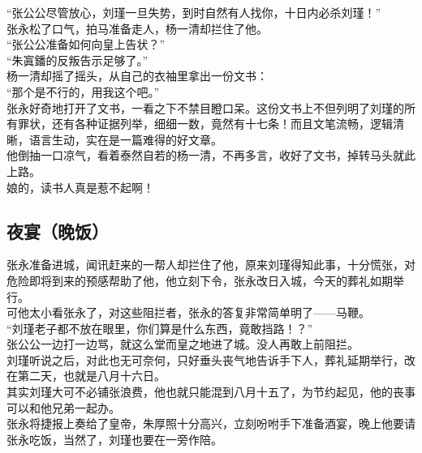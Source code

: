 \begin{multicols}{\theparacolNo}
“张公公尽管放心，刘瑾一旦失势，到时自然有人找你，十日内必杀刘瑾！”\\

张永松了口气，拍马准备走人，杨一清却拦住了他。\\

“张公公准备如何向皇上告状？”\\

“朱寘鐇的反叛告示足够了。”\\

杨一清却摇了摇头，从自己的衣袖里拿出一份文书：\\

“那个是不行的，用我这个吧。”\\

张永好奇地打开了文书，一看之下不禁目瞪口呆。这份文书上不但列明了刘瑾的所有罪状，还有各种证据列举，细细一数，竟然有十七条！而且文笔流畅，逻辑清晰，语言生动，实在是一篇难得的好文章。\\

他倒抽一口凉气，看着泰然自若的杨一清，不再多言，收好了文书，掉转马头就此上路。\\

娘的，读书人真是惹不起啊！\\

\subsection{夜宴（晚饭）}
张永准备进城，闻讯赶来的一帮人却拦住了他，原来刘瑾得知此事，十分慌张，对危险即将到来的预感帮助了他，他立刻下令，张永改日入城，今天的葬礼如期举行。\\

可他太小看张永了，对这些阻拦者，张永的答复非常简单明了——马鞭。\\

“刘瑾老子都不放在眼里，你们算是什么东西，竟敢挡路！？”\\

张公公一边打一边骂，就这么堂而皇之地进了城。没人再敢上前阻拦。\\

刘瑾听说之后，对此也无可奈何，只好垂头丧气地告诉手下人，葬礼延期举行，改在第二天，也就是八月十六日。\\

其实刘瑾大可不必铺张浪费，他也就只能混到八月十五了，为节约起见，他的丧事可以和他兄弟一起办。\\

张永将捷报上奏给了皇帝，朱厚照十分高兴，立刻吩咐手下准备酒宴，晚上他要请张永吃饭，当然了，刘瑾也要在一旁作陪。\\


\end{multicols}
